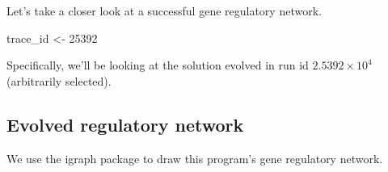 \documentclass[
]{book}
\newenvironment{Shaded}{\begin{snugshade}}{\end{snugshade}}
\newcommand{\DecValTok}[1]{\textcolor[rgb]{0.00,0.00,0.81}{#1}}
\newcommand{\NormalTok}[1]{#1}
\newcommand{\OtherTok}[1]{\textcolor[rgb]{0.56,0.35,0.01}{#1}}
\begin{document}
Let's take a closer look at a successful gene regulatory network.

\begin{Shaded}
\begin{Highlighting}[]
\NormalTok{trace\_id }\OtherTok{\textless{}{-}} \DecValTok{25392}
\end{Highlighting}
\end{Shaded}

Specifically, we'll be looking at the solution evolved in run id \ensuremath{2.5392\times 10^{4}} (arbitrarily selected).

\hypertarget{evolved-regulatory-network-3}{%
\subsection{Evolved regulatory network}\label{evolved-regulatory-network-3}}

We use the igraph package to draw this program's gene regulatory network.
\end{document}
